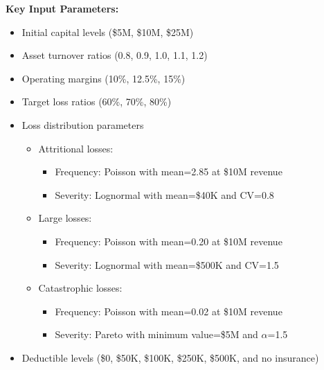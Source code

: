 \documentclass[11pt,letterpaper]{article}
\begin{document}
\textbf{Key Input Parameters:}
\begin{itemize}
    \item Initial capital levels (\$5M, \$10M, \$25M)
    \item Asset turnover ratios (0.8, 0.9, 1.0, 1.1, 1.2)
    \item Operating margins (10\%, 12.5\%, 15\%)
    \item Target loss ratios (60\%, 70\%, 80\%)
    \item Loss distribution parameters
        \begin{itemize}[label=$\circ$]
            \item Attritional losses:
                \begin{itemize}[label=$\raisebox{.45ex}{\rule{.6ex}{.6ex}}$]
                    \item Frequency: Poisson with mean=2.85 at \$10M revenue
                    \item Severity: Lognormal with mean=\$40K and CV=0.8
                \end{itemize}
            \item Large losses:
                \begin{itemize}[label=$\raisebox{.45ex}{\rule{.6ex}{.6ex}}$]
                    \item Frequency: Poisson with mean=0.20 at \$10M revenue
                    \item Severity: Lognormal with mean=\$500K and CV=1.5
                \end{itemize}
            \item Catastrophic losses:
                \begin{itemize}[label=$\raisebox{.45ex}{\rule{.6ex}{.6ex}}$]
                    \item Frequency: Poisson with mean=0.02 at \$10M revenue
                    \item Severity: Pareto with minimum value=\$5M and $\alpha$=1.5
                \end{itemize}
        \end{itemize}
    \item Deductible levels (\$0, \$50K, \$100K, \$250K, \$500K, and no insurance)
\end{itemize}
\end{document}
